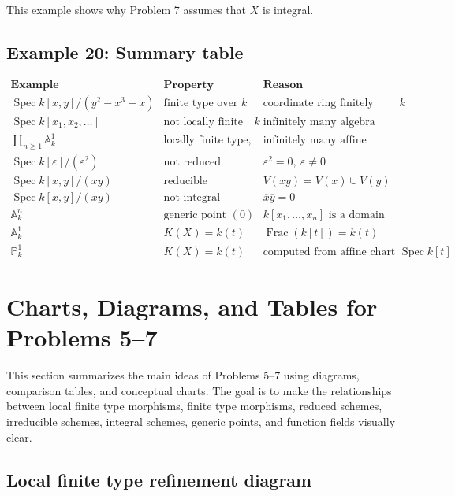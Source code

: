 \documentclass[12pt,a4paper]{article}
\theoremstyle{notespace}
\begin{document}
This example shows why Problem 7 assumes that \(X\) is integral.

\subsection{Example 20: Summary table}

\[
\begin{array}{c|c|c}
	\textbf{Example} & \textbf{Property illustrated} & \textbf{Reason} \\
	\hline
	\operatorname{Spec} k[x,y]/(y^2-x^3-x)
	&
	\text{finite type over }k
	&
	\text{coordinate ring finitely generated over }k
	\\[4pt]
	\operatorname{Spec} k[x_1,x_2,\dots]
	&
	\text{not locally finite type over }k
	&
	\text{infinitely many algebra generators needed}
	\\[4pt]
	\coprod_{n\geq 1}\mathbb A_k^1
	&
	\text{locally finite type, not finite type}
	&
	\text{infinitely many affine components}
	\\[4pt]
	\operatorname{Spec} k[\varepsilon]/(\varepsilon^2)
	&
	\text{not reduced}
	&
	\varepsilon^2=0,\ \varepsilon\neq 0
	\\[4pt]
	\operatorname{Spec} k[x,y]/(xy)
	&
	\text{reducible}
	&
	V(xy)=V(x)\cup V(y)
	\\[4pt]
	\operatorname{Spec} k[x,y]/(xy)
	&
	\text{not integral}
	&
	\overline{x}\overline{y}=0
	\\[4pt]
	\mathbb A_k^n
	&
	\text{generic point }(0)
	&
	k[x_1,\dots,x_n]\text{ is a domain}
	\\[4pt]
	\mathbb A_k^1
	&
	K(X)=k(t)
	&
	\operatorname{Frac}(k[t])=k(t)
	\\[4pt]
	\mathbb P_k^1
	&
	K(X)=k(t)
	&
	\text{computed from affine chart }\operatorname{Spec} k[t]
\end{array}
\]

\section{Charts, Diagrams, and Tables for Problems 5--7}

This section summarizes the main ideas of Problems 5--7 using diagrams, comparison tables, and conceptual charts. The goal is to make the relationships between local finite type morphisms, finite type morphisms, reduced schemes, irreducible schemes, integral schemes, generic points, and function fields visually clear.

\subsection{Local finite type refinement diagram}
\end{document}
